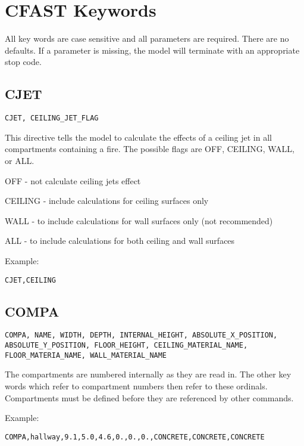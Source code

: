 \chapter{CFAST Keywords}

All key words are case sensitive and all parameters are required. There are no defaults. If a parameter is missing, the model will terminate with an appropriate stop code. 

\section{CJET}

\begin{lstlisting}
CJET, CEILING_JET_FLAG
\end{lstlisting}

This directive tells the model to calculate the effects of a ceiling jet in all compartments containing a fire. The possible flags are OFF, CEILING, WALL, or ALL.

OFF - not calculate ceiling jets effect

CEILING - include calculations for ceiling surfaces only

WALL - to include calculations for wall surfaces only (not recommended)

ALL - to include calculations for both ceiling and wall surfaces

Example:

\begin{lstlisting}
CJET,CEILING
\end{lstlisting}

\section{COMPA}

\begin{lstlisting}
COMPA, NAME, WIDTH, DEPTH, INTERNAL_HEIGHT, ABSOLUTE_X_POSITION, ABSOLUTE_Y_POSITION, FLOOR_HEIGHT, CEILING_MATERIAL_NAME,  FLOOR_MATERIA_NAME, WALL_MATERIAL_NAME
\end{lstlisting}

The compartments are numbered internally as they are read in. The other key words which refer to compartment numbers then refer to these ordinals. Compartments must be defined before they are referenced by other commands.

Example:

\begin{lstlisting}
COMPA,hallway,9.1,5.0,4.6,0.,0.,0.,CONCRETE,CONCRETE,CONCRETE
\end{lstlisting}

